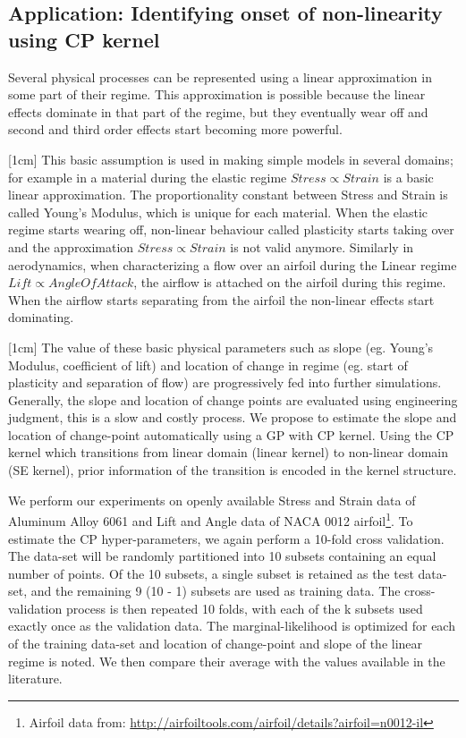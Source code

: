 \subsection{Application: Identifying onset of non-linearity  using CP kernel}\label{subsubsecCh4ApplicationCP}
Several physical processes can be represented using a linear approximation in some part of their regime. This approximation is possible because the linear effects dominate in that part of the regime, but they eventually wear off and second and third order effects start becoming more powerful. 

[1cm]
This basic assumption is used in making simple models in several domains; for example in a material during the elastic regime $Stress \propto Strain$ is a basic linear approximation. The proportionality constant between Stress and Strain is called Young's Modulus, which is unique for each material. When the elastic regime starts wearing off, non-linear behaviour called plasticity starts taking over and the approximation $Stress \propto Strain$ is not valid anymore. Similarly in aerodynamics, when characterizing a flow over an airfoil during the Linear regime  $ Lift \propto Angle Of Attack$, the airflow is attached on the airfoil during this regime. When the airflow starts separating from the airfoil the non-linear effects start dominating. 

\begin{mdframed}[hidealllines=true,backgroundcolor=blue!20]
[1cm]
The value of these basic physical parameters such as slope (eg. Young's Modulus, coefficient of lift) and location of change in regime (eg. start of plasticity and separation of flow) are progressively fed into further simulations. Generally, the slope and location of change points are evaluated using engineering judgment, this is a slow and costly process. We propose to estimate the slope and location of change-point automatically using a GP with CP kernel. Using the CP kernel which transitions from linear domain (linear kernel) to non-linear domain (SE kernel), prior information of the transition is encoded in the kernel structure. 


We perform our experiments on openly available Stress and Strain data of Aluminum Alloy 6061 \cite{kaufman1999properties} and Lift and Angle data of NACA 0012 airfoil\footnote{Airfoil data from: \url{http://airfoiltools.com/airfoil/details?airfoil=n0012-il}}. To estimate the CP hyper-parameters, we again perform a 10-fold cross validation. The data-set will be randomly partitioned into 10 subsets containing an equal number of points. Of the 10 subsets, a single subset is retained as the test data-set, and the remaining 9 (10 - 1) subsets are used as training data. The cross-validation process is then repeated 10 folds, with each of the k subsets used exactly once as the validation data. The marginal-likelihood is optimized for each of the training data-set and location of change-point and slope of the linear regime is noted. We then compare their average with the values available in the literature. 
\end{mdframed}


